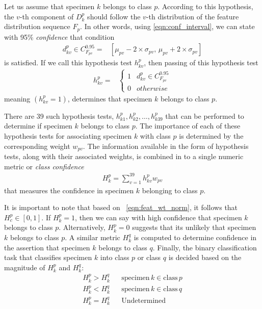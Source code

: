 \documentclass {udthesis}
\begin{document}
Let us assume that specimen $k$ belongs to class $p$. According to this hypothesis, the $v$-th component of $D^p_k$ should follow the $v$-th distribution of the feature distribution sequence $F_p$. In other words, using \eqref{eqn:conf_interval}, we can state with 95\% \textit{confidence} that condition 
%
\begin{align}
  d^p_{kv} \in C^{0.95}_{F_{pv}}= &[\mu_{pv}-2 \times \sigma_{pv},\, \mu_{pv}+2 \times \sigma_{pv}]
  \label{eqn:conf_interval_validation}
\end{align}
%
is satisfied. If we call this hypothesis test $h^p_{kv}$, then passing of this hypothesis test
%
\begin{align}
 h^p_{kv} = &
 \begin{cases}
    1	&	d^p_{kv} \in C^{0.95}_{F_{pv}}\\
    0	&	otherwise
 \end{cases} \label{eqn:hypothesis_test}
\end{align}
%
meaning $(h^p_{kv}=1)$, determines that specimen $k$ belongs to class $p$.

There are 39 such hypothesis tests, $h^p_{k1}, h^p_{k2},\ldots, h^p_{k39}$ that can be performed to determine if specimen $k$ belongs to class $p$.
The importance of each of these hypothesis tests for associating specimen $k$ with class $p$ is determined by the corresponding weight $w_{pv}$. The information available in the form of hypothesis tests, along with their associated weights, is combined in to a single numeric metric or \emph{class confidence} 
%
\begin{align} \label{eqn:numeric_class_metric}
 H^p_k=\sum_{v=1}^{39} h^p_{kv} w_{pv} 
\end{align}
%
that measures the confidence in specimen $k$ belonging to class $p$.

It is important to note that based on ~\eqref{eqn:feat_wt_norm}, it follows that $H^p_c\in[0,1]$. If $H^p_k=1$, then we can say with high confidence that specimen $k$ belongs to class $p$. Alternatively, $H^p_k=0$ suggests that its unlikely that specimen $k$ belongs to class $p$. A similar metric $H^q_k$ is computed to determine confidence in the assertion that
specimen $k$ belongs to class $q$. Finally, the binary classification task that classifies specimen $k$ into class $p$ or class $q$ is decided based on the magnitude of $H^p_k$ and $H^q_k$:
%
\begin{align}	\label{eqn:binary_classification}
 H^p_k > H^q_k	&{} &\text{specimen}\, k \in \text{class}\, p\nonumber\\
 H^p_k < H^q_k	&{} &\text{specimen}\, k \in \text{class}\, q\nonumber\\
 H^p_k = H^q_k	&{} &\text{Undetermined}
\end{align}
\end{document}

